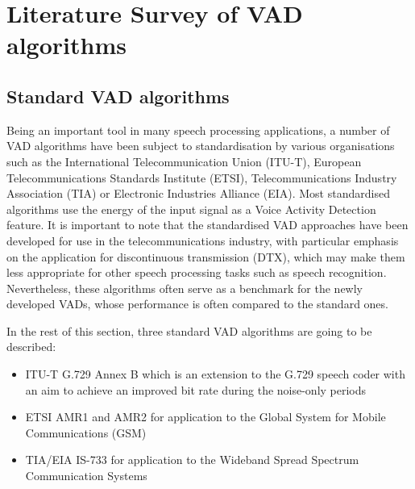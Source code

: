 
\chapter{Literature Survey of VAD algorithms} %

\label{Chapter2} %



\section{Standard VAD algorithms}
\label{sec:StandardVADs}

Being an important tool in many speech processing applications, a number of VAD algorithms have been subject to standardisation by various organisations such as the International Telecommunication Union (ITU-T), European Telecommunications Standards Institute (ETSI), Telecommunications Industry Association (TIA) or Electronic Industries Alliance (EIA). Most standardised algorithms use the energy of the input signal as a Voice Activity Detection feature. It is important to note that the standardised VAD approaches have been developed for use in the telecommunications industry, with particular emphasis on the application for discontinuous transmission (DTX), which may make them less appropriate for other speech processing tasks such as speech recognition. Nevertheless, these algorithms often serve as a benchmark for the newly developed VADs, whose performance is often compared to the standard ones.

In the rest of this section, three standard VAD algorithms are going to be described:
\begin{itemize}
\item ITU-T G.729 Annex B \citep{G729} which is an extension to the G.729 speech coder with an aim to achieve an improved bit rate during the noise-only periods
\item ETSI AMR1 and AMR2 \cite{AMR} for application to the Global System for Mobile Communications (GSM)
\item TIA/EIA IS-733 \cite{IS733} for application to the Wideband Spread Spectrum Communication Systems
\end{itemize}

